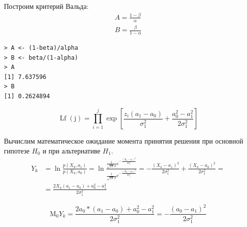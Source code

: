 \documentclass[14pt,a4paper]{scrartcl}
\begin{document}
Построим критерий Вальда:
\begin{align*} 
	A = \frac{1-\beta}{\alpha}\\
	B = \frac{\beta}{1-\alpha}
\end{align*}

\begin{verbatim}
> A <- (1-beta)/alpha
> B <- beta/(1-alpha)
> A
[1] 7.637596
> B
[1] 0.2624894
\end{verbatim}

\begin{equation*}
	\operatorname{Lf}(\mathrm{j})=\prod_{i=1}^{j} \exp{\left[\frac{z_{i}(a_1-a_0)}{\sigma_1^{2}}+\frac{a_0^{2}-a_1^{2}}{2 \sigma_1^{2}}\right]}
\end{equation*}

\begin{figure}[h]
	\label{ris:vald1}
\end{figure}

\newpage

Вычислим математическое ожидание момента принятия решения при основной гипотезе $H_0$ и при альтернативе $H_1$.
\begin{align*}
	Y_{k} &=  \ln \frac{p\left(X_{k}, a_1\right)}{p\left(X_{k}, a_0\right)}=\ln \frac{\frac{1}{\sqrt{2 \pi} \sigma}  e^{-\frac{\left(X_{k}-a_1\right)^{2}}{2 \sigma_1^{2}}}}{\frac{1}{\sqrt{2 \pi} \sigma}  e^{-\frac{\left(X_{k}-a_0\right)^{2}}{2 \sigma_1^{2}}}} = -\frac{\left(X_{k}-a_1\right)^{2}}{2 \sigma_1^{2}}+\frac{\left(X_{k}-a_0\right)^{2}}{2 \sigma_1^{2}}=\\
	&= \frac{2 X_{k}(a_1-a_0)+a_0^{2}-a_1^{2}}{2 \sigma_1^{2}}
\end{align*}

\begin{equation*}
	\mathrm{M_0}Y_k=\frac{2 a_0 *(a_1-a_0)+a_0^{2}-a_1^{2}}{2 \sigma_1^{2}}=-\frac{(a_0-a_1)^{2}}{2 \sigma_1^{2}}
\end{equation*}
\end{document}

